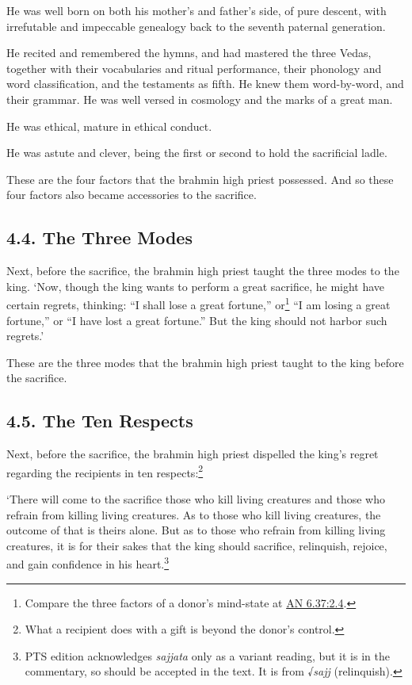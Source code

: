 \documentclass[12pt,openany]{book}%
\begin{document}
He was well born on both his mother’s and father’s side, of pure descent, with irrefutable and impeccable genealogy back to the seventh paternal generation. 

He recited and remembered the hymns, and had mastered the three Vedas, together with their vocabularies and ritual performance, their phonology and word classification, and the testaments as fifth. He knew them word-by-word, and their grammar. He was well versed in cosmology and the marks of a great man. 

He was ethical, mature in ethical conduct. 

He was astute and clever, being the first or second to hold the sacrificial ladle. 

These are the four factors that the brahmin high priest possessed. And so these four factors also became accessories to the sacrifice. 

\subsection*{4.4. The Three Modes }

Next, before the sacrifice, the brahmin high priest taught the three modes to the king. ‘Now, though the king wants to perform a great sacrifice, he might have certain regrets, thinking: “I shall lose a great fortune,” or\footnote{Compare the three factors of a donor’s mind-state at \href{https://suttacentral.net/an6.37/en/sujato\#2.4}{AN 6.37:2.4}. } “I am losing a great fortune,” or “I have lost a great fortune.” But the king should not harbor such regrets.’ 

These are the three modes that the brahmin high priest taught to the king before the sacrifice. 

\subsection*{4.5. The Ten Respects }

Next, before the sacrifice, the brahmin high priest dispelled the king’s regret regarding the recipients in ten respects:\footnote{What a recipient does with a gift is beyond the donor’s control. } 

‘There will come to the sacrifice those who kill living creatures and those who refrain from killing living creatures. As to those who kill living creatures, the outcome of that is theirs alone. But as to those who refrain from killing living creatures, it is for their sakes that the king should sacrifice, relinquish, rejoice, and gain confidence in his heart.\footnote{PTS edition acknowledges \textit{sajjata} only as a variant reading, but it is in the commentary, so should be accepted in the text. It is from √\textit{sajj} (relinquish). } 
\end{document}
